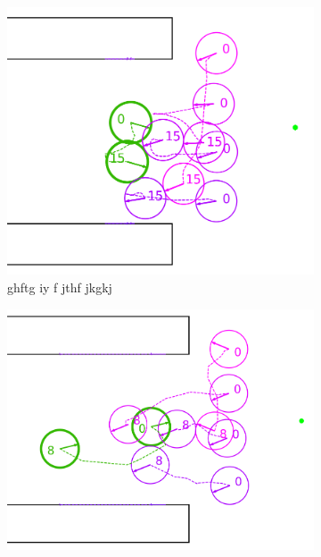 \documentclass[letterpaper, 10 pt, conference]{ieeeconf}  %
\begin{document}
	\begin{figure}
		\centering
		\begin{subfigure}{\linewidth}
			\centering
			\includegraphics[width=\linewidth]{failure_without_failure_controller}
			\caption{ghftg iy f jthf jkgkj}
		\end{subfigure}
		\begin{subfigure}{\linewidth}
			\centering
			\includegraphics[width=\linewidth]{failure_with_failure_controller}
			\caption{}
		\end{subfigure}
	\end{figure}
\end{document}
